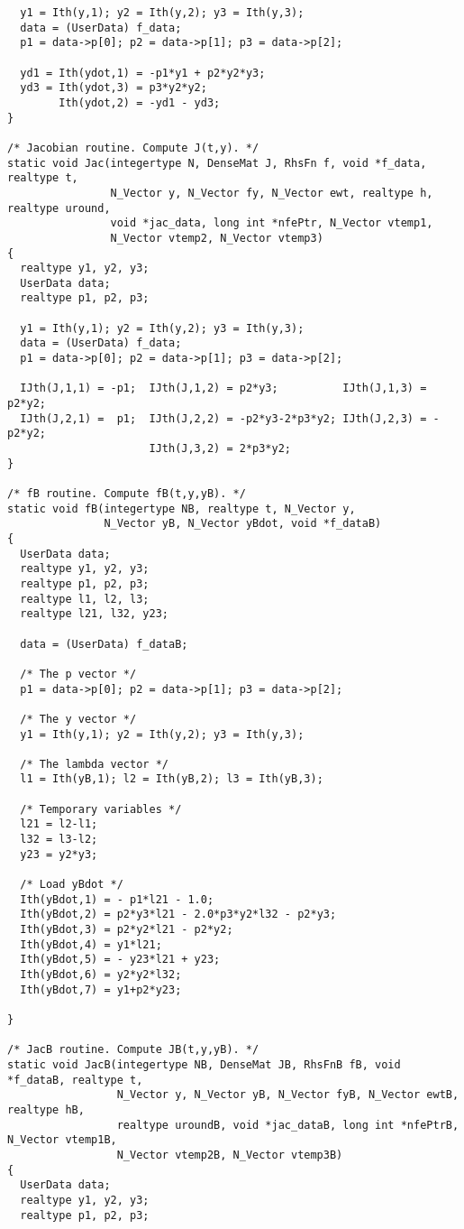 \begin{verbatim}
  y1 = Ith(y,1); y2 = Ith(y,2); y3 = Ith(y,3);
  data = (UserData) f_data;
  p1 = data->p[0]; p2 = data->p[1]; p3 = data->p[2];

  yd1 = Ith(ydot,1) = -p1*y1 + p2*y2*y3;
  yd3 = Ith(ydot,3) = p3*y2*y2;
        Ith(ydot,2) = -yd1 - yd3;
}

/* Jacobian routine. Compute J(t,y). */
static void Jac(integertype N, DenseMat J, RhsFn f, void *f_data, realtype t,
                N_Vector y, N_Vector fy, N_Vector ewt, realtype h, realtype uround,
                void *jac_data, long int *nfePtr, N_Vector vtemp1,
                N_Vector vtemp2, N_Vector vtemp3)
{
  realtype y1, y2, y3;
  UserData data;
  realtype p1, p2, p3;
 
  y1 = Ith(y,1); y2 = Ith(y,2); y3 = Ith(y,3);
  data = (UserData) f_data;
  p1 = data->p[0]; p2 = data->p[1]; p3 = data->p[2];
 
  IJth(J,1,1) = -p1;  IJth(J,1,2) = p2*y3;          IJth(J,1,3) = p2*y2;
  IJth(J,2,1) =  p1;  IJth(J,2,2) = -p2*y3-2*p3*y2; IJth(J,2,3) = -p2*y2;
                      IJth(J,3,2) = 2*p3*y2;
}
 
/* fB routine. Compute fB(t,y,yB). */
static void fB(integertype NB, realtype t, N_Vector y, 
               N_Vector yB, N_Vector yBdot, void *f_dataB)
{
  UserData data;
  realtype y1, y2, y3;
  realtype p1, p2, p3;
  realtype l1, l2, l3;
  realtype l21, l32, y23;
  
  data = (UserData) f_dataB;

  /* The p vector */
  p1 = data->p[0]; p2 = data->p[1]; p3 = data->p[2];

  /* The y vector */
  y1 = Ith(y,1); y2 = Ith(y,2); y3 = Ith(y,3);
  
  /* The lambda vector */
  l1 = Ith(yB,1); l2 = Ith(yB,2); l3 = Ith(yB,3);

  /* Temporary variables */
  l21 = l2-l1;
  l32 = l3-l2;
  y23 = y2*y3;

  /* Load yBdot */
  Ith(yBdot,1) = - p1*l21 - 1.0;
  Ith(yBdot,2) = p2*y3*l21 - 2.0*p3*y2*l32 - p2*y3;
  Ith(yBdot,3) = p2*y2*l21 - p2*y2;
  Ith(yBdot,4) = y1*l21;
  Ith(yBdot,5) = - y23*l21 + y23;
  Ith(yBdot,6) = y2*y2*l32;
  Ith(yBdot,7) = y1+p2*y23;

}

/* JacB routine. Compute JB(t,y,yB). */
static void JacB(integertype NB, DenseMat JB, RhsFnB fB, void *f_dataB, realtype t,
                 N_Vector y, N_Vector yB, N_Vector fyB, N_Vector ewtB, realtype hB, 
                 realtype uroundB, void *jac_dataB, long int *nfePtrB, N_Vector vtemp1B,
                 N_Vector vtemp2B, N_Vector vtemp3B)
{
  UserData data;
  realtype y1, y2, y3;
  realtype p1, p2, p3;
  

\end{verbatim}
